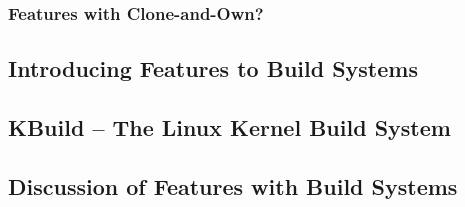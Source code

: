 \subsubsection{Features with Clone-and-Own?}

\subsection{Introducing Features to Build Systems}

\subsection{KBuild -- The Linux Kernel Build System}

\subsection{Discussion of Features with Build Systems}

